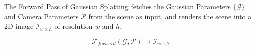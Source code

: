 The Forward Pass of Gaussian Splatting fetches 
the Gaussian Parameters $\{\mathcal{G}\}$ and Camera Parameters $\mathcal{P}$ 
from the scene as input, and renders the scene into a 2D image $\mathcal{I}_{w\times h}$ of resolution $w$ and $h$.

$$\mathcal{F}_{forward}(\mathcal{G},\mathcal{P})\rightarrow \mathcal{I}_{w\times h}$$

